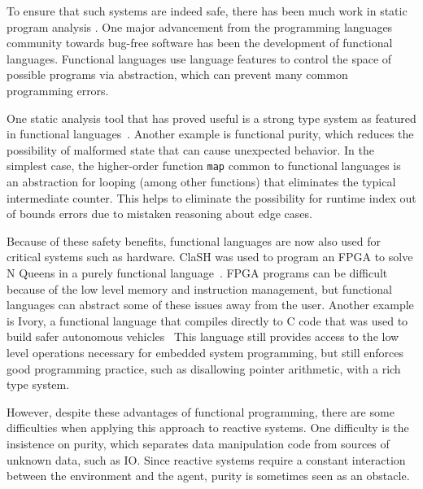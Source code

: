 To ensure that such systems are indeed safe, there has been much work in static program analysis .
One major advancement from the programming languages community towards bug-free software has been the development of functional languages.
Functional languages use language features to control the space of possible programs via abstraction, which can prevent many common programming errors.

One static analysis tool that has proved useful is a strong type system as featured in functional languages~\cite{cardelli1996type}.
Another example is functional purity, which reduces the possibility of malformed state that can cause unexpected behavior.
In the simplest case, the higher-order function \texttt{map} common to functional languages is an abstraction for looping (among other functions) that eliminates the typical intermediate counter.
This helps to eliminate the possibility for runtime index out of bounds errors due to mistaken reasoning about edge cases.

Because of these safety benefits, functional languages are now also used for critical systems such as hardware.
ClaSH was used to program an FPGA to solve N Queens in a purely functional language~\cite{clash2014}.
FPGA programs can be difficult because of the low level memory and instruction management, but functional languages can abstract some of these issues away from the user.
Another example is Ivory, a functional language that compiles directly to C code that was used to build safer autonomous vehicles~\cite{pike2014}
This language still provides access to the low level operations necessary for embedded system programming, but still enforces good programming practice, such as disallowing pointer arithmetic, with a rich type system.

However, despite these advantages of functional programming, there are some difficulties when applying this approach to reactive systems.
One difficulty is the insistence on purity, which separates data manipulation code from sources of unknown data, such as IO.
Since reactive systems require a constant interaction between the environment and the agent, purity is sometimes seen as an obstacle.

